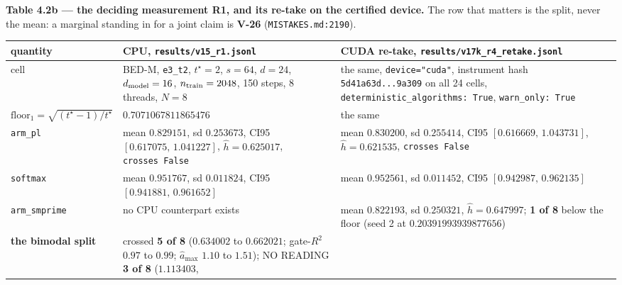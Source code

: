 \documentclass[11pt,a4paper]{article}
\newcounter{none}                 %
\theoremstyle{plain}
\theoremstyle{definition}
\theoremstyle{remark}
\begin{document}
\textbf{Table 4.2b --- the deciding measurement R1, and its re-take on
the certified device.} The row that matters is the split, never the
mean: a marginal standing in for a joint claim is \textbf{V-26}
(\texttt{MISTAKES.md:2190}).

{\def\LTcaptype{none} %
\begin{longtable}[]{@{}
  >{\raggedright\arraybackslash}p{}
  >{\raggedright\arraybackslash}p{}
  >{\raggedright\arraybackslash}p{}@{}}
\toprule\noalign{}
\begin{minipage}[b]{\linewidth}\raggedright
quantity
\end{minipage} & \begin{minipage}[b]{\linewidth}\raggedright
CPU, \texttt{results/v15\_r1.jsonl}
\end{minipage} & \begin{minipage}[b]{\linewidth}\raggedright
CUDA re-take, \texttt{results/v17k\_r4\_retake.jsonl}
\end{minipage} \\
\midrule\noalign{}
\endhead
\bottomrule\noalign{}
\endlastfoot
cell & BED-M, \texttt{e3\_t2}, \(t^\star=2\), \(s=64\), \(d=24\),
\(d_{\rm model}=16\), \(n_{\rm train}=2048\), 150 steps, 8 threads,
\(N=8\) & the same, \texttt{device="cuda"}, instrument hash
\texttt{5d41a63d...9a309} on all 24 cells,
\texttt{deterministic\_algorithms:\ True}, \texttt{warn\_only:\ True} \\
\(\mathrm{floor}_1=\sqrt{(t^\star-1)/t^\star}\) & \(0.7071067811865476\)
& the same \\
\texttt{arm\_pl} & mean \(0.829151\), sd \(0.253673\), CI95
\([0.617075,\,1.041227]\), \(\hat h=0.625017\), \texttt{crosses\ False}
& mean \(0.830200\), sd \(0.255414\), CI95 \([0.616669,\,1.043731]\),
\(\hat h=0.621535\), \texttt{crosses\ False} \\
\texttt{softmax} & mean \(0.951767\), sd \(0.011824\), CI95
\([0.941881,\,0.961652]\) & mean \(0.952561\), sd \(0.011452\), CI95
\([0.942987,\,0.962135]\) \\
\texttt{arm\_smprime} & no CPU counterpart exists & mean \(0.822193\),
sd \(0.250321\), \(\hat h=0.647997\); \textbf{1 of 8} below the floor
(seed 2 at \(0.20391993939877656\)) \\
\textbf{the bimodal split} & crossed \textbf{5 of 8} (\(0.634002\) to
\(0.662021\); gate-\(R^{2}\) \(0.97\) to \(0.99\); \(\hat a_{\max}\)
\(1.10\) to \(1.51\)); NO READING \textbf{3 of 8} (\(1.113403\),

\end{longtable}}
\end{document}
